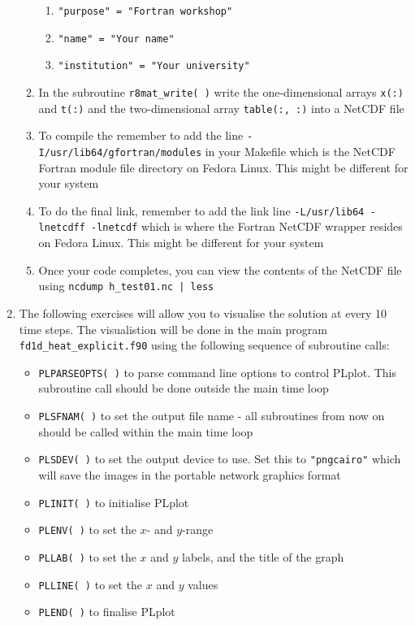 \documentclass[12pt]{article}
\begin{document}
\begin{enumerate}
\begin{enumerate}
  \begin{enumerate}
  \item\texttt{"purpose" = "Fortran workshop"}
  \item\texttt{"name" = "Your name"}
  \item\texttt{"institution" = "Your university"} 
  \end{enumerate}
\item In the subroutine \texttt{r8mat\_write( )} write the one-dimensional arrays \texttt{x(:)} and \texttt{t(:)} and the two-dimensional array \texttt{table(:, :)} into a NetCDF file
\item To compile the remember to add the line \texttt{-I/usr/lib64/gfortran/modules} in your
  Makefile which is the NetCDF Fortran module file directory on Fedora Linux. This might be
  different for your system
\item To do the final link, remember to add the link line \texttt{-L/usr/lib64 -lnetcdff -lnetcdf}
  which is where the Fortran NetCDF wrapper resides on Fedora Linux. This might be different
  for your system
\item Once your code completes, you can view the contents of the NetCDF file using \texttt{ncdump h\_test01.nc | less}
\end{enumerate}
\item The following exercises will allow you to visualise the solution at every 10 time steps. The
visualistion will be done in the main program \texttt{fd1d\_heat\_explicit.f90} using the
following sequence of subroutine calls:
\begin{itemize}
\item\texttt{PLPARSEOPTS( )} to parse command line options to control PLplot. This subroutine
call should be done outside the main time loop
\item\texttt{PLSFNAM( )} to set the output file name - all subroutines from now on should be
called within the main time loop
\item\texttt{PLSDEV( )} to set the output device to use. Set this to \texttt{"pngcairo"} which
will save the images in the portable network graphics format
\item\texttt{PLINIT( )} to initialise PLplot
\item\texttt{PLENV( )} to set the $x$- and $y$-range
\item\texttt{PLLAB( )} to set the $x$ and $y$ labels, and the title of the graph
\item\texttt{PLLINE( )} to set the $x$ and $y$ values
\item\texttt{PLEND( )} to finalise PLplot

\end{itemize}
\end{enumerate}
\end{document}
